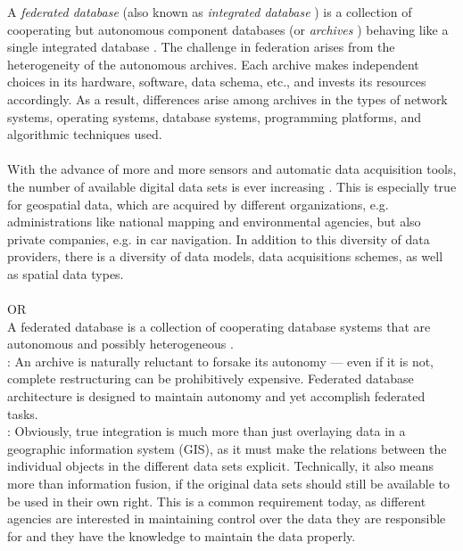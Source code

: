 \documentclass[12pt,a4paper]{report}
\newcommand{\term}{\textit}
\begin{document}
	A \term{federated database} (also known as \term{integrated database} \citep{Jian}) is a collection of cooperating but autonomous component databases (or \term{archives} \citep{Malik}) behaving like a single integrated database \citep{Malik}. The challenge in federation arises from the heterogeneity of the autonomous archives. Each  archive  makes  independent choices in its hardware, software, data schema, etc., and invests its resources accordingly. As a result, differences arise among archives in the types of network systems, operating systems, database systems, programming platforms, and algorithmic techniques used. 
	\\\\
	With the advance of more and more sensors and automatic data acquisition tools, the number of available digital data sets is ever increasing \citep{Butenuth}. This is especially true for geospatial data, which are acquired by different organizations, e.g. administrations like national mapping and environmental agencies, but also private companies, e.g. in car navigation. In addition to this diversity of data providers, there is a diversity of data models, data acquisitions schemes, as well as spatial data types.
	\\
	\\OR\\
	A federated database is a collection of cooperating database systems that are autonomous and possibly heterogeneous \citep{Sheth}.
	\\

	\citep{Malik}: An archive is naturally reluctant to forsake its autonomy --- even if it is not, complete restructuring can be prohibitively expensive. Federated database architecture is designed to maintain autonomy and yet accomplish federated tasks.
	\\

	\citep{Butenuth}: Obviously, true integration is much more than just overlaying data in a geographic information system (GIS), as it must make the relations between the individual objects in the different data sets explicit. Technically, it also means more than information fusion, if the original data sets should still be available to be used in their own right. This is a common requirement today, as different agencies are interested in maintaining control over the data they are responsible for and they have the knowledge to maintain the data properly.
	\\
\end{document}
